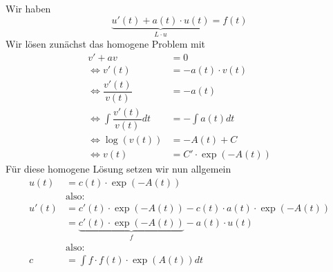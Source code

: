 \documentclass[main.tex]{subfiles}
\begin{document}
\begin{enumerate}
    \begin{Beispiel}
      Wir haben
      $$\underbrace{u'(t) + a(t) \cdot u(t)}_{L \cdot u} = f(t)$$
      Wir lösen zunächst das homogene Problem mit
      $$\begin{aligned}
        v' + av & = 0 \\
        \Leftrightarrow v'(t) & = -a(t) \cdot v(t) \\
        \Leftrightarrow \dfrac{v'(t)}{v(t)} & = -a(t) \\
        \Leftrightarrow \int \dfrac{v'(t)}{v(t)} dt & = - \int a(t) dt \\
        \Leftrightarrow \log(v(t)) & = -A(t) +C \\
        \Leftrightarrow v(t) & = C' \cdot \exp(-A(t))
      \end{aligned}$$
      Für diese homogene Lösung setzen wir nun allgemein
      $$\begin{aligned}
        u(t) & = c(t) \cdot \exp(-A(t)) \\
        & \text{also:} \\
        u'(t) & =c'(t) \cdot \exp(-A(t)) - c(t) \cdot a(t) \cdot \exp(-A(t)) \\
        & = \underbrace{c'(t) \cdot \exp(-A(t))}_{f} -a(t) \cdot u(t) \\
        & \text{also:} \\
        c & = \int f \cdot f(t) \cdot \exp(A(t)) dt
      \end{aligned}$$
    \end{Beispiel}


\end{enumerate}
\end{document}
